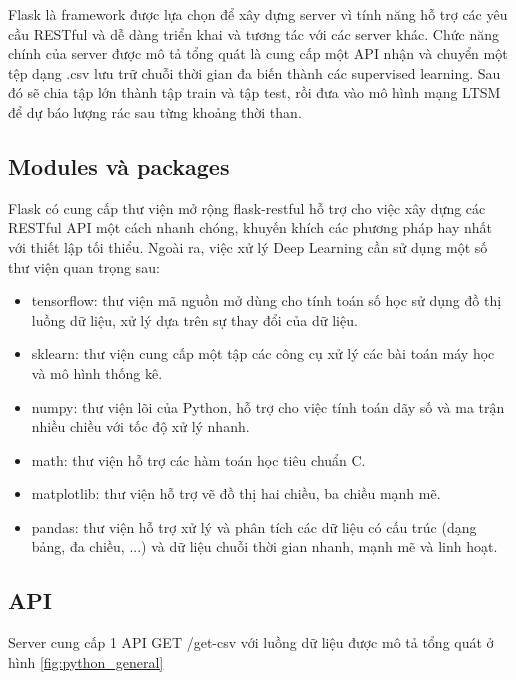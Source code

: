Flask là framework được lựa chọn để xây dựng server vì tính năng hỗ trợ các yêu cầu RESTful và dễ dàng triển khai và tương tác với các server khác. Chức năng chính của server được mô tả tổng quát là cung cấp một API nhận và chuyển một tệp dạng .csv lưu trữ chuỗi thời gian đa biến thành các supervised learning. Sau đó sẽ chia tập lớn thành tập train và tập test, rồi đưa vào mô hình mạng LTSM để dự báo lượng rác sau từng khoảng thời than. 

\subsection{Modules và packages}
Flask có cung cấp thư viện mở rộng flask-restful hỗ trợ cho việc xây dựng các RESTful API một cách nhanh chóng, khuyến khích các phương pháp hay nhất với thiết lập tối thiểu. Ngoài ra, việc xử lý Deep Learning cần sử dụng một số thư viện quan trọng sau:

\begin{itemize}
    \item tensorflow: thư viện mã nguồn mở dùng cho tính toán số học sử dụng đồ thị luồng dữ liệu, xử lý dựa trên sự thay đổi của dữ liệu.
    \item sklearn: thư viện cung cấp một tập các công cụ xử lý các bài toán máy học và mô hình thống kê.
    \item numpy: thư viện lõi của Python, hỗ trợ cho việc tính toán dãy số và ma trận nhiều chiều với tốc độ xử lý nhanh.
    \item math: thư viện hỗ trợ các hàm toán học tiêu chuẩn C.
    \item matplotlib: thư viện hỗ trợ vẽ đồ thị hai chiều, ba chiều mạnh mẽ.
    \item pandas: thư viện hỗ trợ xử lý và phân tích các dữ liệu có cấu trúc (dạng bảng, đa chiều, ...) và dữ liệu chuỗi thời gian nhanh, mạnh mẽ và linh hoạt.
\end{itemize}

\subsection{API}
Server cung cấp 1 API GET /get-csv với luồng dữ liệu được mô tả tổng quát ở hình \ref{fig:python_general}

